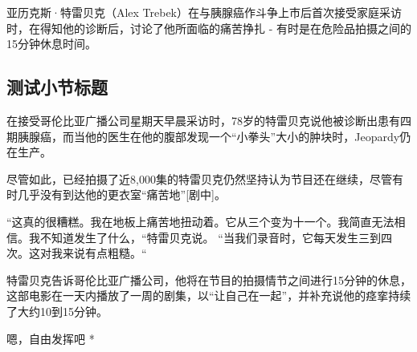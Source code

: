 亚历克斯·特雷贝克（Alex Trebek）在与胰腺癌作斗争上市后首次接受家庭采访时，在得知他的诊断后，讨论了他所面临的痛苦挣扎 - 有时是在危险品拍摄之间的15分钟休息时间。

\subsection{测试小节标题}
在接受哥伦比亚广播公司星期天早晨采访时，78岁的特雷贝克说他被诊断出患有四期胰腺癌，而当他的医生在他的腹部发现一个“小拳头”大小的肿块时，Jeopardy仍在生产。

尽管如此，已经拍摄了近8,000集的特雷贝克仍然坚持认为节目还在继续，尽管有时几乎没有到达他的更衣室“痛苦地”[剧中]。

“这真的很糟糕。我在地板上痛苦地扭动着。它从三个变为十一个。我简直无法相信。我不知道发生了什么，“特雷贝克说。 “当我们录音时，它每天发生三到四次。这对我来说有点粗糙。“

特雷贝克告诉哥伦比亚广播公司，他将在节目的拍摄情节之间进行15分钟的休息，这部电影在一天内播放了一周的剧集，以“让自己在一起”，并补充说他的痉挛持续了大约10到15分钟。


\par * 嗯，自由发挥吧 * \par